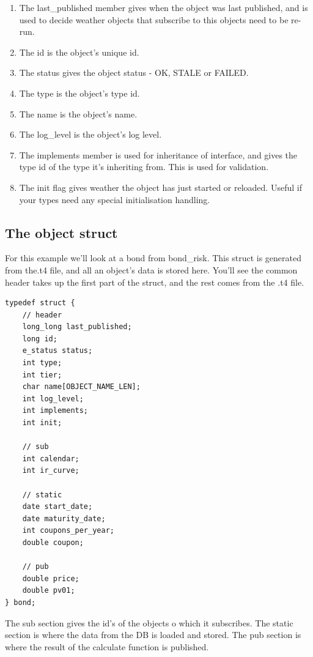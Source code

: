 \documentclass{report}
\begin{document}
\begin{enumerate}
\item The last_published member gives when the object was last published, and is used to decide weather objects that subscribe to this objects need to be re-run.
\item The id is the object's unique id.
\item The status gives the object status - OK, STALE or FAILED.
\item The type is the object's type id.
\item The name is the object's name.
\item The log_level is the object's log level.
\item The implements member is used for inheritance of interface, and gives the type id of the type it's inheriting from. This is used for validation.
\item The init flag gives weather the object has just started or reloaded. Useful if your types need any special initialisation handling.
\end{enumerate}

\subsection{The object struct}

For this example we'll look at a bond from bond_risk. This struct is generated from the.t4 file, and all an object's data is stored here. You'll see the common header takes up the first part of the struct, and the rest comes from the .t4 file.

\begin{verbatim}
typedef struct {
    // header
    long_long last_published;
    long id;
    e_status status;
    int type;
    int tier;
    char name[OBJECT_NAME_LEN];
    int log_level;
    int implements;
    int init;

    // sub
    int calendar;
    int ir_curve;

    // static
    date start_date;
    date maturity_date;
    int coupons_per_year;
    double coupon;

    // pub
    double price;
    double pv01;
} bond;
\end{verbatim}

The sub section gives the id's of the objects o which it subscribes. The static section is where the data from the DB is loaded and stored. The pub section is where the result of the calculate function is published.
\end{document}
